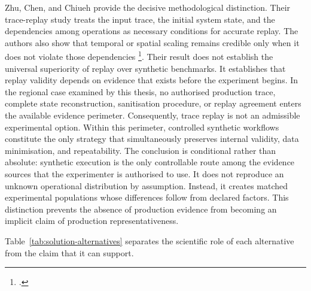 \noindent Zhu, Chen, and Chiueh provide the decisive methodological distinction. Their
trace-replay study treats the input trace, the initial system state, and the
dependencies among operations as necessary conditions for accurate replay. The
authors also show that temporal or spatial scaling remains credible only when it
does not violate those dependencies \footcite{zhu-tbbt-trace-replay}. Their
result does not establish the universal superiority of replay over synthetic
benchmarks. It establishes that replay validity depends on evidence that exists
before the experiment begins. In the regional case examined by this thesis, no
authorised production trace, complete state reconstruction, sanitisation
procedure, or replay agreement enters the available evidence perimeter.
Consequently, trace replay is not an admissible experimental option. Within this perimeter, controlled synthetic workflows constitute the only
strategy that simultaneously preserves internal validity, data minimisation, and
repeatability. The conclusion is conditional rather than absolute: synthetic
execution is the only controllable route among the evidence sources that the
experimenter is authorised to use. It does not reproduce an unknown operational
distribution by assumption. Instead, it creates matched experimental populations
whose differences follow from declared factors. This distinction prevents the
absence of production evidence from becoming an implicit claim of production
representativeness.

\noindent Table~\ref{tab:solution-alternatives} separates the scientific role of each
alternative from the claim that it can support.


